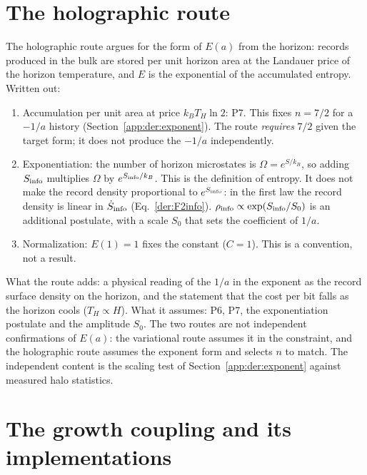 \section{The holographic route}\label{app:der:routes}
The holographic route argues for the form of $E(a)$ from the horizon: records produced in the bulk are stored per unit horizon area at the
Landauer price of the horizon temperature, and $E$ is the exponential of the accumulated entropy. Written out:
\begin{enumerate}
\item Accumulation per unit area at price $k_BT_H\ln2$: P7. This fixes $n=7/2$ for a $-1/a$ history (Section~\ref{app:der:exponent}). The route
\emph{requires} $7/2$ given the target form; it does not produce the $-1/a$ independently.
\item Exponentiation: the number of horizon microstates is $\Omega=e^{S/k_B}$, so adding $S_{\rm info}$ multiplies $\Omega$ by $e^{S_{\rm info}/k_B}$.
This is the definition of entropy. It does not make the record density proportional to $e^{S_{\rm info}}$: in the first law the record density is
linear in $\dot S_{\rm info}$ (Eq.~\eqref{der:F2info}). $\rho_{\rm info}\propto\exp(S_{\rm info}/S_0)$ is an additional postulate, with a scale $S_0$
that sets the coefficient of $1/a$. \conjecture
\item Normalization: $E(1)=1$ fixes the constant ($C=1$). This is a convention, not a result.
\end{enumerate}
What the route adds: a physical reading of the $1/a$ in the exponent as the record surface density on the horizon, and the statement that the
cost per bit falls as the horizon cools ($T_H\propto H$). What it assumes: P6, P7, the exponentiation postulate and the amplitude $S_0$. The two routes
are not independent confirmations of $E(a)$: the variational route assumes it in the constraint, and the holographic route assumes the exponent form
and selects $n$ to match. The independent content is the scaling test of Section~\ref{app:der:exponent} against measured halo statistics.

\section{The growth coupling and its implementations}\label{app:der:growth}
